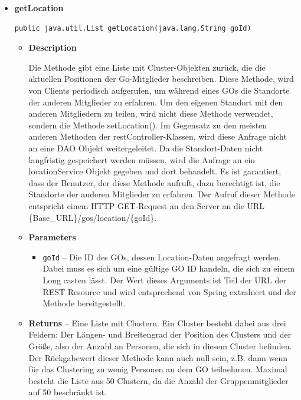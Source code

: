 \documentclass[11pt,a4paper]{article}
\begin{document}
{{{{{{{{{{{{{{{{{{{\begin{itemize}
{\begin{itemize}
{\begin{itemize}
  \end{itemize}
}%
\end{itemize}
}%
\item{ 
\hypertarget{edu.kit.pse17.go_app.ClientCommunication.Upstream.GoRestController.getLocation(java.lang.String)}{{\bf  getLocation}\\}
\begin{lstlisting}[frame=none]
public java.util.List getLocation(java.lang.String goId)\end{lstlisting} %
\begin{itemize}
\item{
{\bf  Description}

Die Methode gibt eine Liste mit Cluster-Objekten zurück, die die aktuellen Positionen der Go-Mitglieder beschreiben. Diese Methode, wird von Clients periodisch aufgerufen, um während eines GOs die Standorte der anderen Mitglieder zu erfahren. Um den eigenen Standort mit den anderen Mitgliedern zu teilen, wird nicht diese Methode verwendet, sondern die Methode setLocation(). Im Gegensatz zu den meisten anderen Methoden der restController-Klassen, wird diese Anfrage nicht an eine DAO Objekt weitergeleitet. Da die Standort-Daten nicht langfristig gespeichert werden müssen, wird die Anfrage an ein locationService Objekt gegeben und dort behandelt. Es ist garantiert, dass der Benutzer, der diese Methode aufruft, dazu berechtigt ist, die Standorte der anderen Mitglieder zu erfahren. Der Aufruf dieser Methode entspricht einem HTTP GET-Request an den Server an die URL \{Base\_URL\}/gos/location/\{goId\}.
}
\item{
{\bf  Parameters}
  \begin{itemize}
   \item{
\texttt{goId} -- Die ID des GOs, dessen Location-Daten angefragt werden. Dabei muss es sich um eine gültige GO ID handeln, die sich zu einem Long casten lässt. Der Wert dieses Arguments ist Teil der URL der REST Resource und wird entsprechend von Spring extrahiert und der Methode bereitgestellt.}
  \end{itemize}
}%
\item{{\bf  Returns} -- 
Eine Liste mit Clustern. Ein Cluster besteht dabei aus drei Feldern: Der Längen- und Breitengrad der Position des Clusters und der Größe, also der Anzahl an Personen, die sich in diesem Cluster befinden. Der Rückgabewert dieser Methode kann auch null sein, z.B. dann wenn für das Clustering zu wenig Personen an dem GO teilnehmen. Maximal besteht die Liste aus 50 Clustern, da die Anzahl der Gruppenmitglieder auf 50 beschränkt ist. 
}
\end{itemize}}
\end{itemize}}}}}}}}}}}}}}}}}}}}
\end{document}
